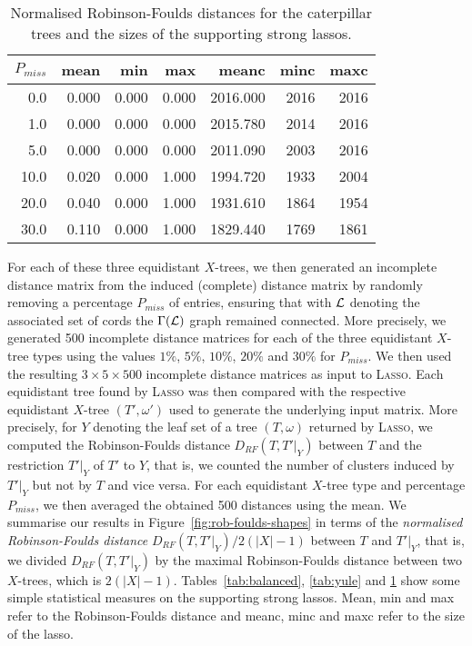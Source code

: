 \begin{table}
  \centering
  \begin{tabular}{rrrrrrr}
    \toprule
    $P_{miss}$ & mean    &  min    &  max   &  meanc  &   minc &   maxc\\
    \midrule
    0.0  &  0.000  &  0.000  &  0.000 & 2016.000  &   2016   &  2016\\
    1.0  &  0.000  &  0.000  &  0.000 & 2015.780  &   2014   &  2016\\
    5.0  &  0.000  &  0.000  &  0.000 & 2011.090  &   2003   &  2016\\
    10.0 &   0.020 &   0.000 &   1.000 & 1994.720 &   1933  &   2004\\
    20.0 &   0.040 &   0.000 &   1.000 &  1931.610 &   1864  &  1954\\
    30.0 &   0.110 &   0.000 &   1.000 &  1829.440 &   1769  &  1861\\
    \bottomrule
  \end{tabular}
  \caption{Normalised Robinson-Foulds distances for the
    caterpillar trees and the sizes of the supporting strong lassos.}
  \label{tab:caterpillar}
\end{table}

For each of these three equidistant $X$-trees, we then generated an incomplete
distance matrix from the induced (complete) distance matrix by randomly
removing a percentage $P_{miss}$ of entries, ensuring that with ${\mathcal L}$ denoting
the associated set of cords the $\Gamma({\mathcal L})$ graph remained connected. More
precisely, we generated 500 incomplete distance matrices for each of the three
equidistant $X$-tree types using the values $1\%$, $5\%$, $10\%$, $20\%$ and
$30\%$ for $P_{miss}$.  We then used the resulting $3 \times 5 \times 500$
incomplete distance matrices as input to \textsc{Lasso}. Each equidistant tree
found by \textsc{Lasso} was then compared with the respective equidistant
$X$-tree $(T',\omega')$ used to generate the underlying input matrix. More
precisely, for $Y$ denoting the leaf set of a tree $(T,\omega)$ returned by
\textsc{Lasso}, we computed the Robinson-Foulds distance
\cite{robinson1981comparison} $D_{RF}(T,T'|_Y)$ between $T$ and the
restriction $T'|_Y$ of $T'$ to $Y$, that is, we counted the number of clusters
induced by $T'|_Y$ but not by $T$ and vice versa.  For each equidistant
$X$-tree type and percentage $P_{miss}$, we then averaged the obtained 500
distances using the mean. We summarise our results in
Figure~\ref{fig:rob-foulds-shapes} in terms of the {\em normalised
  Robinson-Foulds distance} $D_{RF}(T,T'|_Y)/2(|X|-1)$ between $T$ and
$T'|_Y$, that is, we divided $D_{RF}(T,T'|_Y)$ by the maximal Robinson-Foulds
distance between two $X$-trees, which is $2(|X|-1)$.
Tables~\ref{tab:balanced}, \ref{tab:yule} and \ref{tab:caterpillar} show some
simple statistical measures on the supporting strong lassos.  Mean, min and
max refer to the Robinson-Foulds distance and meanc, minc and maxc refer to
the size of the lasso.

